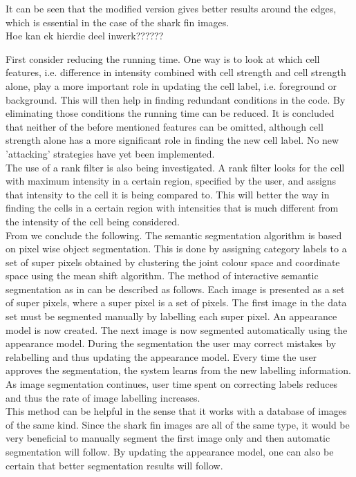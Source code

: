 \documentclass[a4paper,10pt]{article}
\begin{document}
\noindent It can be seen that the modified version gives better results around
the edges, which is essential in the case of the shark fin images. \\ 

Hoe kan ek hierdie deel inwerk??????

First consider reducing the running time.  One way is to look at which cell
features, i.e. difference in intensity combined with cell strength and cell
strength alone, play a more important role in updating the cell label, i.e.
foreground or background.   This will then help in finding 
redundant conditions in the code.  By eliminating those conditions the running
time can be reduced.  It is concluded that neither of the before
mentioned features can be omitted, although cell strength alone has a more
significant role in finding the new cell label.  No new 'attacking' 
strategies have yet been implemented. \\

The use of a rank filter is also being investigated.  A rank filter looks for
the cell with maximum intensity in a certain region, specified by the user, 
and assigns that intensity to the cell it is being compared to.  This will
better the way in finding the cells in a certain region with intensities that
is much different from the intensity of the cell being considered. \\  

\noindent From \cite{RF} we conclude the following.  The semantic segmentation
algorithm is based on pixel wise object segmentation.  This is done by 
assigning category labels to a set of super pixels obtained by clustering the
joint colour space and coordinate space using the mean shift algorithm.
The method of interactive semantic segmentation as in \cite{RF} can be described
as follows.  Each image is presented as a set of super pixels, where 
a super pixel is a set of pixels.  The first image in the data set must be
segmented manually by labelling each super pixel.  An appearance model is 
now created.  The next image is now segmented automatically using the appearance
model.  During the segmentation the user may correct mistakes by 
relabelling and thus updating the appearance model.  Every time the user
approves the segmentation, the system learns from the new labelling information.
As image segmentation continues, user time spent on correcting labels reduces
and thus the rate of image labelling increases.  \\

This method can be helpful in the sense that it works with a database of images
of the same kind.  Since the shark fin images are all of the same type, 
it would be very beneficial to manually segment the first image only and then
automatic segmentation will follow.  By updating the appearance model, 
one can also be certain that better segmentation results will follow.  \\  
\end{document}
